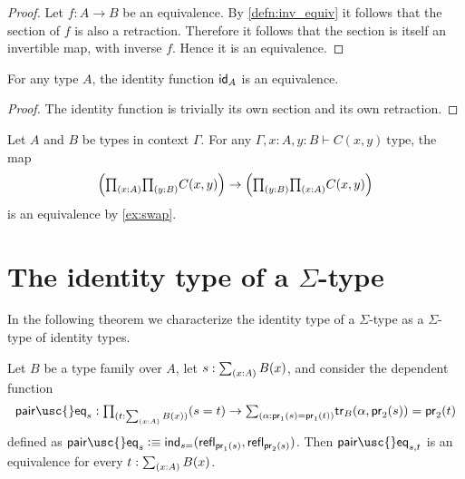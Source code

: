 \begin{proof}
Let $f:A\to B$ be an equivalence. By \cref{defn:inv_equiv} it follows that the section of $f$ is also a retraction. Therefore it follows that the section is itself an invertible map, with inverse $f$. Hence it is an equivalence.
\end{proof}

\begin{thm}\label{thm:id_equiv}
For any type $A$, the identity function $\idfunc[A]$ is an equivalence.
\end{thm}

\begin{proof}
The identity function is trivially its own section and its own retraction.
\end{proof}

\begin{eg}
Let $A$ and $B$ be types in context $\Gamma$. 
For any $\Gamma,x:A,y:B\vdash C(x,y)~\mathrm{type}$, the map
\begin{equation*}
\Big(\prd{x:A}{y:B}C(x,y)\Big)\to\Big(\prd{y:B}{x:A}C(x,y)\Big)
\end{equation*}
is an equivalence by \cref{ex:swap}.
\end{eg}

\section{The identity type of a \texorpdfstring{$\Sigma$-}{dependent pair }type}

In the following theorem we characterize the identity type of a $\Sigma$-type as a $\Sigma$-type of identity types.


\begin{thm}\label{thm:eq_sigma}
Let $B$ be a type family over $A$, let $s:\sm{x:A}B(x)$, and consider the dependent function
\begin{equation*}
\mathsf{pair\usc{}eq}_{s}:\prd{t:\sm{x:A}B(x)} (s=t)\to \sm{\alpha:\proj 1(s)=\proj 1(t)} \mathsf{tr}_B(\alpha,\proj 2(s))=\proj 2(t)
\end{equation*}
defined as $\mathsf{pair\usc{}eq}_s \defeq \ind{s=}(\refl{\proj 1(s)},\refl{\proj 2(s)})$. Then $\mathsf{pair\usc{}eq}_{s,t}$ is an equivalence for every $t:\sm{x:A}B(x)$.
\end{thm}

